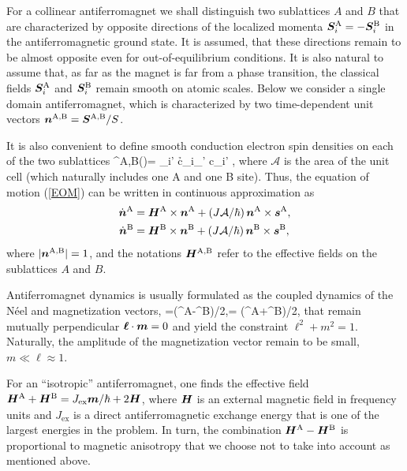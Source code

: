 For a collinear antiferromagnet we shall distinguish two sublattices $A$ and $B$ that are characterized by opposite directions of the localized momenta $\boldsymbol{S}_i^\textrm{A}=-\boldsymbol{S}_i^\textrm{B}$ in the antiferromagnetic ground state. It is assumed, that these directions remain to be almost opposite even for out-of-equilibrium conditions. It is also natural to assume that, as far as the magnet is far from a phase transition, the classical fields $\boldsymbol{S}_i^\textrm{A}$ and $\boldsymbol{S}_i^\textrm{B}$ remain smooth on atomic scales. Below we consider a single domain antiferromagnet, which is characterized by two time-dependent unit vectors $\boldsymbol{n}^\textrm{A,B}=\boldsymbol{S}^\textrm{A,B}/S$. 

It is also convenient to define smooth conduction electron spin densities on each of the two sublattices
\be
{}^\textrm{A,B}()=  \s_{i\sigma\sigma'} \lt\la c\h_{i\sigma}\bb{\sigma}_{\sigma\sigma'} c\0_{i\sigma'} \rt\ra\;,
\e
where $\mathcal{A}$ is the area of the unit cell (which naturally includes one A and one B site). Thus, the equation of motion (\ref{EOM}) can be written in  continuous approximation as
\beml
\label{EOMAFM}
\begin{align}
\dot{\boldsymbol{n}}^\textrm{A} &= \boldsymbol{H}^\textrm{A}\times \boldsymbol{n}^\textrm{A}+ (J\mathcal{A}/\hbar)\, \boldsymbol{n}^\textrm{A}\times \boldsymbol{s}^\textrm{A},\\
\dot{\boldsymbol{n}}^\textrm{B}&= \boldsymbol{H}^\textrm{B}\times \boldsymbol{n}^\textrm{B}+ (J\mathcal{A}/\hbar)\, \boldsymbol{n}^\textrm{B}\times \boldsymbol{s}^\textrm{B},
\end{align}
\eml
where $|\boldsymbol{n}^\textrm{A,B}|=1$, and the notations $\boldsymbol{H}^\textrm{A,B}$ refer to the effective fields on the sublattices $A$ and $B$. 

Antiferromagnet dynamics is usually formulated as the coupled dynamics of the N\'eel and magnetization vectors,
\be
\bb{\ell}=\lt(^\textrm{A}-^\textrm{B}\rt)/2,\qquad {}= \lt(^\textrm{A}+^\textrm{B}\rt)/2,
\e
that remain mutually perpendicular $\boldsymbol{\ell}\cdot \boldsymbol{m}=0$ and yield the constraint $\ell^2+m^2=1$. Naturally, the amplitude of the magnetization vector remain to be small, $m\ll \ell \approx 1$.

For an ``isotropic'' antiferromagnet, one finds the effective field \cite{Gomonay2014} $\boldsymbol{H}^\textrm{A}+\boldsymbol{H}^\textrm{B}= J_\textrm{ex}\boldsymbol{m}/\hbar+2\boldsymbol{H}$, where $\boldsymbol{H}$ is an external magnetic field in frequency units and $J_\textrm{ex}$ is a direct antiferromagnetic exchange energy that is one of the largest energies in the problem. In turn, the combination $\boldsymbol{H}^\textrm{A}-\boldsymbol{H}^\textrm{B}$ is proportional to magnetic anisotropy that we choose not to take into account as mentioned above.  

